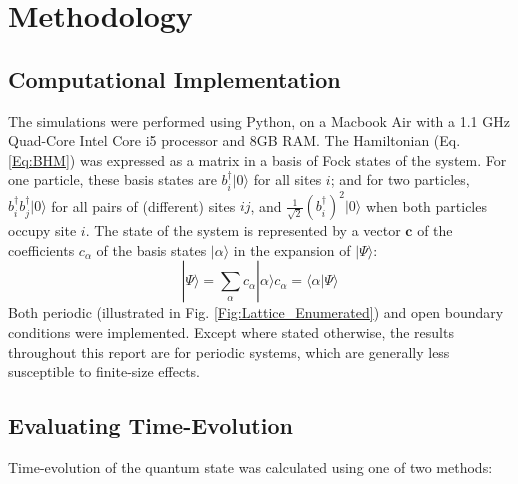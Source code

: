 \chapter{Methodology}\label{Sec:Methodology}

\section{Computational Implementation}

The simulations were performed using Python, on a Macbook Air with a 1.1 GHz Quad-Core Intel Core i5 processor and 8GB RAM. The Hamiltonian (Eq. \ref{Eq:BHM}) was expressed as a matrix in a basis of Fock states of the system. For one particle, these basis states are $b_i^{\dag}|0\rangle$ for all sites $i$; and for two particles, $b_i^{\dag}b_j^{\dag}|0\rangle$ for all pairs of (different) sites $ij$, and $\frac{1}{\sqrt{2}}(b_i^{\dag})^2|0\rangle$ when both particles occupy site $i$. The state of the system is represented by a vector $\textbf{c}$ of the coefficients $c_\alpha$ of the basis states $|\alpha\rangle$ in the expansion of $|\Psi\rangle$:
\begin{subequations}
    \begin{equation}
        |\Psi\rangle = \sum_{\alpha}c_\alpha |\alpha\rangle
    \end{equation}
    \begin{equation}
        c_\alpha = \langle \alpha|\Psi \rangle
    \end{equation}
\end{subequations}
Both periodic (illustrated in Fig. \ref{Fig:Lattice_Enumerated}) and open boundary conditions were implemented. Except where stated otherwise, the results throughout this report are for periodic systems, which are generally less susceptible to finite-size effects. 

\section{Evaluating Time-Evolution}

Time-evolution of the quantum state was calculated using one of two methods:

